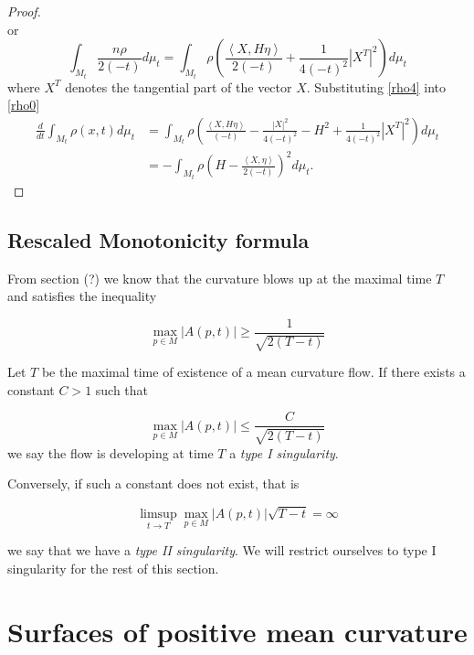 \begin{proof}
\begin{equation*}
\end{equation*}
or 
\begin{equation}
\int_{M_{t}}\frac{n\rho}{2(-t)} d \mu_{t} = \int_{M_{t}} \rho \left(  \frac{\left< X,H \eta \right>}{2(-t)} + \frac{1}{4(-t)^2}|X^T|^2 \right)d \mu_{t}\label{rho4}
\end{equation}
where $ X^{T} $ denotes the tangential part of the vector $ X $. Substituting \cref{rho4} into \cref{rho0}
\begin{align*}
\frac{d}{dt} \int_{M_{t}}\rho(x,t)d \mu_{t}  &=  \int_{M_{t}}\rho\left(\frac{\left< X,H \eta\right>}{(-t)}- \frac{|X|^{2}}{4(-t)^{2}} -H^{2}+ \frac{1}{4(-t)^2}|X^T|^2\right)d \mu_{t}\\ 
& = -\int_{M_{t}} \rho \left( H - \frac{\left< X, \eta \right>}{2(-t)} \right)^{2} d \mu_{t}.
\end{align*}
\end{proof}

\subsection{Rescaled Monotonicity formula}\label{Type1singularity}

From section (?) we know that the curvature blows up at the maximal time $ T $  and satisfies the inequality

\[ \max_{p \in M}|A(p,t)| \ge \frac{1}{\sqrt{2(T-t)}} \]

\begin{defn}
Let $ T $ be the maximal time of existence of a mean curvature flow. If there exists a constant $ C >1 $ such that 

    \[ \max_{p \in M}|A(p,t)| \le \frac{C}{\sqrt{2(T-t)}} \]
we say the flow is developing at time $ T $ a \textit{type I singularity}.
\end{defn}

Conversely, if such a constant does not exist, that is 

\[ \limsup_{t \to T} \max_{p \in M}|A(p,t)|\sqrt{T-t} = \infty \]

we say that we have a \textit{type II singularity}. We will restrict ourselves to type I singularity for the rest of this section. 


\section{Surfaces of positive mean curvature}

